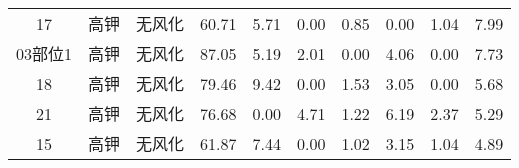 \documentclass[withoutpreface,bwprint]{cumcmthesis} %
\begin{document}
\begin{appendices}
\begin{table}[!h]
\begin{tabular}{@{}cccccccccc@{}}
		17                                                        & 高钾          & 无风化                                                      & 60.71                                                          & 5.71                                                         & 0.00                                                         & 0.85                                                         & 0.00                                                           & 1.04                                                           & 7.99                                                            \\
		03部位1                                                     & 高钾          & 无风化                                                      & 87.05                                                          & 5.19                                                         & 2.01                                                         & 0.00                                                         & 4.06                                                           & 0.00                                                           & 7.73                                                            \\
		18                                                        & 高钾          & 无风化                                                      & 79.46                                                          & 9.42                                                         & 0.00                                                         & 1.53                                                         & 3.05                                                           & 0.00                                                           & 5.68                                                            \\
		21                                                        & 高钾          & 无风化                                                      & 76.68                                                          & 0.00                                                         & 4.71                                                         & 1.22                                                         & 6.19                                                           & 2.37                                                           & 5.29                                                            \\
		15                                                        & 高钾          & 无风化                                                      & 61.87                                                          & 7.44                                                         & 0.00                                                         & 1.02                                                         & 3.15                                                           & 1.04                                                           & 4.89                                                            \\

\end{tabular}
\end{table}
\end{appendices}
\end{document}
